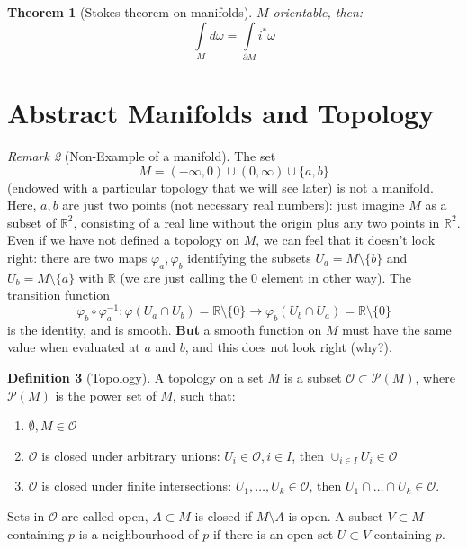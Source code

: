 \documentclass[a4paper,11pt,titlepage]{article}
\numberwithin{equation}{section}
\newtheorem{theorem}{Theorem}[section]
\theoremstyle{definition}
\newtheorem{definition}[theorem]{Definition}
\theoremstyle{remark}
\newtheorem{remark}[theorem]{Remark}
\newcommand{\rfield}{\mathbb{R}}
\begin{document}
\begin{theorem}[Stokes theorem on manifolds]
  $M$ orientable, then:
  \begin{equation}
    \int\limits_M d \omega = \int\limits_{\partial M} i^* \omega
  \end{equation}
\end{theorem}

\newpage
\section{Abstract Manifolds and Topology}
\begin{remark}[Non-Example of a manifold]
The set $$M= (-\infty, 0) \cup (0, \infty) \cup \{a, b\}$$ (endowed with a particular topology that we will see later) is not a manifold. Here, $a, b$ are just two points (not necessary real numbers): just imagine $M$ as a subset of $\rfield^2$, consisting of a real line without the origin plus any two points in $\rfield^2$. Even if we have not defined a topology on $M$, we can feel that it doesn't look right: there are two maps $\varphi_a, \varphi_b$ identifying the subsets $U_a = M \setminus \{b\}$ and $U_b = M \setminus \{a\}$ with $\rfield$ (we are just calling the 0 element in other way). The transition function
$$\varphi_b \circ \varphi_a^{-1} \colon \varphi(U_a \cap U_b) = \rfield \setminus \{0\} \rightarrow \varphi_b(U_b \cap U_a) = \rfield \setminus \{0\}$$
is the identity, and is smooth. \textbf{But}  a smooth function on $M$ must have the same value when evaluated at $a$ and $b$, and this does not look right (why?).
\end{remark}

\begin{definition}[Topology] \label{top}
A topology on a set $M$ is a subset $\mathcal{O} \subset \mathcal{P}(M)$, where $\mathcal{P}(M)$ is the power set of $M$, such that:
\begin{enumerate}
	\item $\emptyset, M \in \mathcal{O}$
	\item $\mathcal{O}$ is closed under arbitrary unions: $U_i \in \mathcal{O}, i \in I$, then $\cup_{i \in I} U_i \in \mathcal{O}$
	\item $\mathcal{O}$ is closed under finite intersections: $U_1, \ldots, U_k \in \mathcal{O}$, then $U_1 \cap \ldots \cap U_k \in \mathcal{O}$.
\end{enumerate}
Sets in $\mathcal{O}$ are called open, $A \subset M$ is closed if $M \setminus A$ is open. A subset $V \subset M$ containing $p$ is a neighbourhood of $p$ if there is an open set $U \subset V$ containing $p$.
\end{definition}
\end{document}
